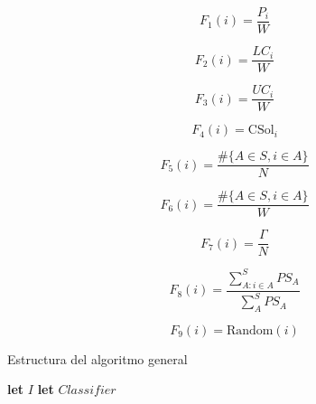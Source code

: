 \documentclass[spanish, a4paper, 12pt, twoside, openany,final]{book}
\numberwithin{equation}{section}                %
\begin{document}
\begin{multicols}{2}
	


\begin{equation}
	F_1\left(i\right)   = \frac{P_i}{W}
	\label{feature:1}
\end{equation}

\begin{equation}
	F_2\left(i\right)   = \frac{LC_i}{W}
	\label{feature:2}
\end{equation}

\begin{equation}
	F_3\left(i\right)   = \frac{UC_i}{W}
	\label{feature:3}
\end{equation}

\begin{equation}
	F_4\left(i\right)   = \text{CSol}_i
	\label{feature:4}
\end{equation}

\begin{equation}
	F_5\left(i\right)   = \frac{\#\{A\in S,i \in A \}}{N}
	\label{feature:5}
\end{equation}

\begin{equation}
	F_6\left(i\right)   = \frac{\#\{A\in S,i \in A \}}{W}
	\label{feature:6}
\end{equation}


\begin{equation}
	F_7\left(i\right)   = \frac{\Gamma}{N}
	\label{feature:7}
\end{equation}


\begin{equation}
	F_8\left(i\right)   = \frac{\sum^S_{A: i\in A} PS_{A}}{\sum^S_{A} PS_A}
	\label{feature:8}
\end{equation}

\begin{equation}
	F_9\left(i\right)   = \text{Random}\left(i\right)
	\label{feature:9}
\end{equation}

\end{multicols}
\begin{algorithm}
	\caption{Estructura del algoritmo general}\label{alg:general}
	\begin{algorithmic}
		\State \textbf{let} $I$			  
		\State \textbf{let} $Classifier$  
		\Loop
		
		\EndLoop
	\end{algorithmic}
\end{algorithm}
\end{document}
